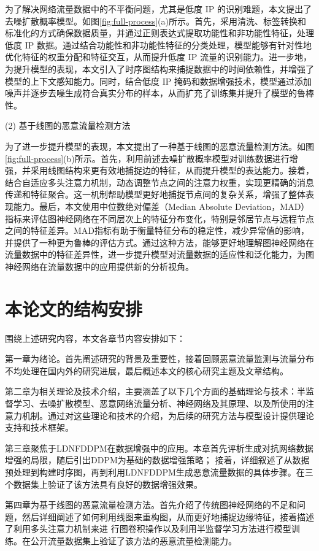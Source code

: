 \documentclass[promaster]{thesis-uestc}
\begin{document}
   为了解决网络流量数据中的不平衡问题，尤其是低度 IP 的识别难题，本文提出了去噪扩散概率模型。如图\ref{fig:full-process}(a)所示。首先，采用清洗、标签转换和标准化的方式确保数据质量，并通过正则表达式提取功能性和非功能性特征，处理低度 IP 数据。通过结合功能性和非功能性特征的分类处理，模型能够有针对性地优化特征的权重分配和特征交互，从而提升低度 IP 流量的识别能力。进一步地，为提升模型的表现，本文引入了时序图结构来捕捉数据中的时间依赖性，并增强了模型的上下文感知能力。同时，结合低度 IP 掩码和数据增强技术，模型通过添加噪声并逐步去噪生成符合真实分布的样本，从而扩充了训练集并提升了模型的鲁棒性。

(2) 基于线图的恶意流量检测方法  

   为了进一步提升模型的表现，本文提出了一种基于线图的恶意流量检测方法。如图\ref{fig:full-process}(b)所示。首先，利用前述去噪扩散概率模型对训练数据进行增强，并采用线图结构来更有效地捕捉边的特征，从而提升模型的表达能力。接着，结合自适应多头注意力机制，动态调整节点之间的注意力权重，实现更精确的消息传递和特征聚合。这一机制帮助模型更好地捕捉节点间的复杂关系，增强了整体表现能力。最后，本文使用中位数绝对偏差（Median Absolute Deviation，MAD）指标来评估图神经网络在不同层次上的特征分布变化，特别是邻居节点与远程节点之间的特征差异。MAD指标有助于衡量特征分布的稳定性，减少异常值的影响，并提供了一种更为鲁棒的评估方式。通过这种方法，能够更好地理解图神经网络在流量数据中的特征差异性，进一步提升模型对流量数据的适应性和泛化能力，为图神经网络在流量数据中的应用提供新的分析视角。
\section{本论文的结构安排}
围绕上述研究内容，本文各章节内容安排如下：

第一章为绪论。首先阐述研究的背景及重要性，接着回顾恶意流量监测与流量分布不均处理在国内外的研究进展，最后概述本文的核心研究主题及文章结构。

第二章为相关理论及技术介绍，主要涵盖了以下几个方面的基础理论与技术：半监督学习、去噪扩散模型、恶意网络流量分析、神经网络及其原理、以及所使用的注意力机制。通过对这些理论和技术的介绍，为后续的研究方法与模型设计提供理论支持和技术框架。

第三章聚焦于LDNFDDPM在数据增强中的应用。本章首先评析生成对抗网络数据增强的局限，随后引出DDPM为基础的数据增强策略；
接着，详细叙述了从数据预处理到构建时序图，再到利用LDNFDDPM生成恶意流量数据的具体步骤。在三个数据集上验证了该方法具有良好的数据增强效果。

第四章为基于线图的恶意流量检测方法。首先介绍了传统图神经网络的不足和问题，然后详细阐述了如何利用线图来重构图，从而更好地捕捉边缘特征，接着描述了利用多头注意力机制来进
行图卷积操作以及利用半监督学习方法进行模型训练。在公开流量数据集上验证了该方法的恶意流量检测能力。
\end{document}
